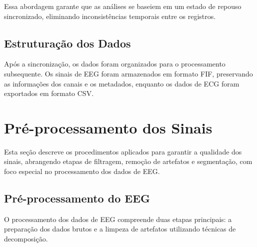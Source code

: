 Essa abordagem garante que as análises se baseiem em um estado de repouso sincronizado, eliminando inconsistências temporais entre os registros.

\subsection{Estruturação dos Dados}
Após a sincronização, os dados foram organizados para o processamento subsequente. Os sinais de EEG foram armazenados em formato FIF, preservando as informações dos canais e os metadados, enquanto os dados de ECG foram exportados em formato CSV.

\section{Pré-processamento dos Sinais}
Esta seção descreve os procedimentos aplicados para garantir a qualidade dos sinais, abrangendo etapas de filtragem, remoção de artefatos e segmentação, com foco especial no processamento dos dados de EEG.

\subsection{Pré-processamento do EEG}
O processamento dos dados de EEG compreende duas etapas principais: a preparação dos dados brutos e a limpeza de artefatos utilizando técnicas de decomposição.

